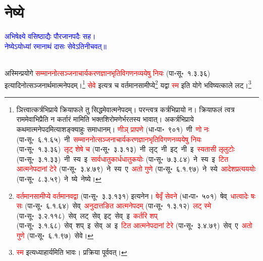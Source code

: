 \section[नेष्ये]{नेष्ये}
\centering\textcolor{blue}{अभिषेक्ष्ये वसिष्ठाद्यैः पौरजानपदैः सह।\nopagebreak\\
नेष्येऽयोध्यां रमानाथं दासः सेवेऽतिनीचवत्॥}\nopagebreak\\
\\
\fontsize{14}{21}\selectfont\begin{sloppypar}\justifying\noindent\hspace{10mm} अस्मिन्प्रयोगे \textcolor{red}{सम्माननोत्सञ्जनाचार्य\-करण\-ज्ञान\-भृति\-विगणन\-व्ययेषु नियः} (पा॰सू॰~१.३.३६) इत्यादिनोत्सञ्जनार्थमात्मनेपदम्।\footnote{ञित्त्वात्कर्त्रभिप्राये क्रियाफले तु सिद्धमेवात्मने\-पदम्। परन्त्वत्र कर्त्रभिप्रायो न। क्रियाफलं त्वत्र राममेवाभिप्रैति न कर्तारं मामिति भक्तशिरोमणेर्भरतस्य भावात्। अकर्त्रभिप्राये कथमात्मने\-पदमित्याशङ्क्याहुः समाधानम्। \textcolor{red}{णीञ् प्रापणे} (धा॰पा॰~९०१)~\arrow णी~\arrow \textcolor{red}{णो नः} (पा॰सू॰~६.१.६५)~\arrow नी~\arrow \textcolor{red}{सम्माननोत्सञ्जनाचार्य\-करण\-ज्ञान\-भृति\-विगणन\-व्ययेषु नियः} (पा॰सू॰~१.३.३६)~\arrow \textcolor{red}{लृट् शेषे च} (पा॰सू॰~३.३.१३)~\arrow नी~लृट्~\arrow नी~इट्~\arrow नी~इ~\arrow \textcolor{red}{स्यतासी लृलुटोः} (पा॰सू॰~३.१.३३)~\arrow नी~स्य~इ~\arrow \textcolor{red}{सार्वधातुकार्ध\-धातुकयोः} (पा॰सू॰~७.३.८४)~\arrow ने~स्य~इ~\arrow \textcolor{red}{टित आत्मनेपदानां टेरे} (पा॰सू॰~३.४.७९)~\arrow ने~स्य~ए~\arrow \textcolor{red}{अतो गुणे} (पा॰सू॰~६.१.९७)~\arrow ने~स्ये~\arrow \textcolor{red}{आदेश\-प्रत्यययोः} (पा॰सू॰~८.३.५९)~\arrow ने~ष्ये~\arrow नेष्ये।} \textcolor{red}{सेवे} इत्यत्र च वर्तमान\-सामीप्ये\footnote{\textcolor{red}{वर्तमान\-सामीप्ये वर्तमानवद्वा} (पा॰सू॰~३.३.१३१) इत्यनेन। \textcolor{red}{षेवृँ सेवने} (धा॰पा॰~५०१)~\arrow षेव्~\arrow \textcolor{red}{धात्वादेः षः सः} (पा॰सू॰~६.१.६४)~\arrow सेव्~\arrow \textcolor{red}{अनुदात्तङित आत्मने\-पदम्} (पा॰सू॰~१.३.१२)~\arrow \textcolor{red}{लट् स्मे} (पा॰सू॰~३.२.११८)~\arrow सेव्~लट्~\arrow सेव्~इट्~\arrow सेव्~इ~\arrow \textcolor{red}{कर्तरि शप्‌} (पा॰सू॰~३.१.६८)~\arrow सेव्~शप्~इ~\arrow सेव्~अ~इ~\arrow \textcolor{red}{टित आत्मनेपदानां टेरे} (पा॰सू॰~३.४.७९)~\arrow सेव्~ए~\arrow \textcolor{red}{अतो गुणे} (पा॰सू॰~६.१.९७)~\arrow सेवे।} यद्वा \textcolor{red}{स्म} इति योगे भविष्यत्काले लट्।\footnote{\textcolor{red}{स्म} इत्यध्याहार्यमिति भावः। प्रक्रिया पूर्ववत्।}\end{sloppypar}

